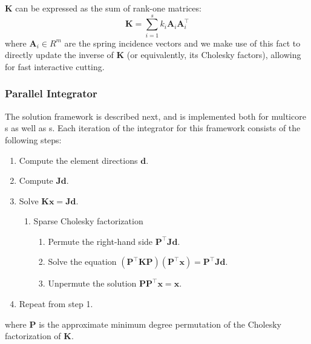 $\mathbf{K}$ can be expressed as the sum of rank-one matrices:
\begin{equation}
  \mathbf{K} = \sum_{i = 1}^s k_i\mathbf{A}_i\mathbf{A}_i^\intercal
\end{equation}
where $\mathbf{A}_i \in R^{m}$ are the spring incidence vectors and we make use of this fact to directly update the inverse of $\mathbf{K}$ (or equivalently, its Cholesky factors), allowing for fast interactive cutting.



\subsubsection{Parallel Integrator}
The solution framework is described next, and is implemented both for multicore s as well as s. Each iteration of the integrator for this framework consists of the following steps:
\begin{enumerate}
  \item Compute the element directions $\mathbf{d}$.
  \item Compute $\mathbf{Jd}$.
  \item Solve $\mathbf{Kx} = \mathbf{Jd}$.
  \begin{enumerate}
    \item Sparse Cholesky factorization
    \begin{enumerate}
      \item Permute the right-hand side $\mathbf{P^\intercal Jd}$.
      \item Solve the equation $\mathbf{(P^\intercal KP)(P^\intercal x)} = \mathbf{P^\intercal Jd}$.
      \item Unpermute the solution $\mathbf{PP^\intercal x} = \mathbf{x}$.
    \end{enumerate}
  \end{enumerate}

  \item Repeat from step 1.
\end{enumerate}
where $\mathbf{P}$ is the approximate minimum degree permutation of the
Cholesky factorization of $\mathbf{K}$.

